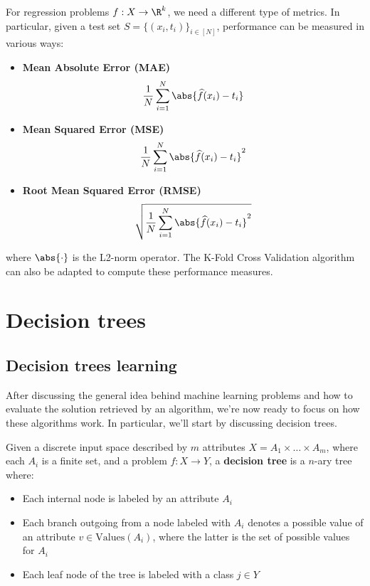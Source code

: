 \documentclass[a4paper, 12pt]{report}
\begin{document}
    For regression problems $f : X \to \R^k$, we need a different type of metrics. In particular, given a test set $S = \{(x_i, t_i)\}_{i \in [N]}$, performance can be measured in various ways:
    \begin{itemize}
        \item \textbf{Mean Absolute Error (MAE)}
        \[\frac{1}{N} \sum_{i=1}^N \abs{\widehat{f}(x_i) - t_i} \]
        \item \textbf{Mean Squared Error (MSE)}
        \[\frac{1}{N} \sum_{i = 1}^N \abs{\widehat{f}(x_i) - t_i}^2\]
        \item \textbf{Root Mean Squared Error (RMSE)}
        \[\sqrt{\frac{1}{N} \sum_{i = 1}^N \abs{\widehat{f}(x_i) - t_i}^2}\]
    \end{itemize}

    where $\abs{\cdot}$ is the L2-norm operator. The K-Fold Cross Validation algorithm can also be adapted to compute these performance measures.

    \chapter{Decision trees}

    \section{Decision trees learning}

    After discussing the general idea behind machine learning problems and how to evaluate the solution retrieved by an algorithm, we're now ready to focus on how these algorithms work. In particular, we'll start by discussing decision trees.

    Given a discrete input space described by $m$ attributes $X = A_1 \times \ldots \times A_m$, where each $A_i$ is a finite set, and a problem $f : X \to Y$, a \textbf{decision tree} is a $n$-ary tree where:
    \begin{itemize}
        \item Each internal node is labeled by an attribute $A_i$
        \item Each branch outgoing from a node labeled with $A_i$ denotes a possible value of an attribute $v \in \mathrm{Values}(A_i)$, where the latter is the set of possible values for $A_i$
        \item Each leaf node of the tree is labeled with a class $j \in Y$
    \end{itemize}
\end{document}

